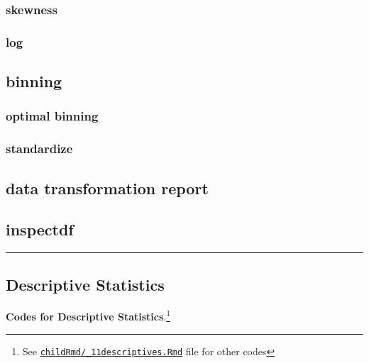 \documentclass[
]{article}
\begin{document}
\hypertarget{skewness}{%
\subsubsection{skewness}\label{skewness}}

\hypertarget{log}{%
\subsubsection{log}\label{log}}

\hypertarget{binning}{%
\subsection{binning}\label{binning}}

\hypertarget{optimal-binning}{%
\subsubsection{optimal binning}\label{optimal-binning}}

\hypertarget{standardize}{%
\subsubsection{standardize}\label{standardize}}

\hypertarget{data-transformation-report}{%
\subsection{data transformation
report}\label{data-transformation-report}}

\hypertarget{inspectdf}{%
\subsection{inspectdf}\label{inspectdf}}

\begin{center}\rule{0.5\linewidth}{0.5pt}\end{center}

\pagebreak

\hypertarget{descriptive-statistics}{%
\subsection{Descriptive Statistics}\label{descriptive-statistics}}

\textbf{Codes for Descriptive Statistics}.\footnote{See
  \href{https://github.com/sbalci/histopathology-template/blob/master/childRmd/_11descriptives.Rmd}{\texttt{childRmd/\_11descriptives.Rmd}}
  file for other codes}
\end{document}
